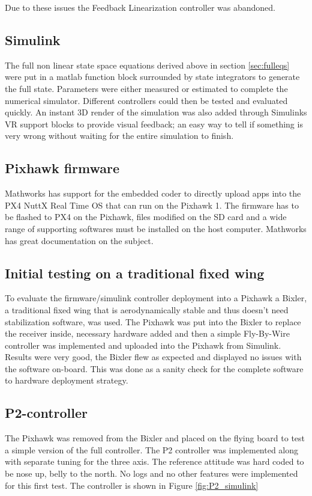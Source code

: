 \documentclass{article}
\begin{document}
Due to these issues the Feedback Linearization controller was abandoned.


\subsection{Simulink}
The full non linear state space equations derived above in section \ref{sec:fulleqs} were put in a matlab function block surrounded by state integrators to generate the full state.
Parameters were either measured or estimated to complete the numerical simulator.
Different controllers could then be tested and evaluated quickly.
An instant 3D render of the simulation was also added through Simulinks VR support blocks to provide visual feedback; an easy way to tell if something is very wrong without waiting for the entire simulation to finish.


\subsection{Pixhawk firmware}
Mathworks has support for the embedded coder to directly upload apps into the PX4 NuttX Real Time OS that can run on the Pixhawk 1.
The firmware has to be flashed to PX4 on the Pixhawk, files modified on the SD card and a wide range of supporting softwares must be installed on the host computer.
Mathworks has great documentation on the subject.\cite{MathworksPX4}

\subsection{Initial testing on a traditional fixed wing}
To evaluate the firmware/simulink controller deployment into a Pixhawk a Bixler, a traditional fixed wing that is aerodynamically stable and thus doesn't need stabilization software, was used.
The Pixhawk was put into the Bixler to replace the receiver inside, necessary hardware added and then a simple Fly-By-Wire controller was implemented and uploaded into the Pixhawk from Simulink.
Results were very good, the Bixler flew as expected and displayed no issues with the software on-board.
This was done as a sanity check for the complete software to hardware deployment strategy.


\subsection{P2-controller}
The Pixhawk was removed from the Bixler and placed on the flying board to test a simple version of the full controller.
The P2 controller \cite{P2} was implemented along with separate tuning for the three axis.
The reference attitude was hard coded to be nose up, belly to the north.
No logs and no other features were implemented for this first test.
The controller is shown in Figure \ref{fig:P2_simulink}
\end{document}
